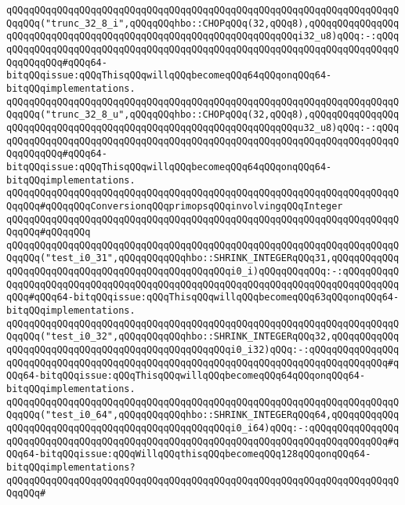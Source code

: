 \newline
\verb|qQQqqQQqqQQqqQQqqQQqqQQqqQQqqQQqqQQqqQQqqQQqqQQqqQQqqQQqqQQqqQQqqQQqqQQqqQQq("trunc_32_8_i",qQQqqQQqhbo::CHOPqQQq(32,qQQq8),qQQqqQQqqQQqqQQqqQQqqQQqqQQqqQQqqQQqqQQqqQQqqQQqqQQqqQQqqQQqqQQqqQQqi32_u8)qQQq:-:qQQqqQQqqQQqqQQqqQQqqQQqqQQqqQQqqQQqqQQqqQQqqQQqqQQqqQQqqQQqqQQqqQQqqQQqqQQqqQQqqQQq#qQQq64-bitqQQqissue:qQQqThisqQQqwillqQQqbecomeqQQq64qQQqonqQQq64-bitqQQqimplementations.|\newline
\verb|qQQqqQQqqQQqqQQqqQQqqQQqqQQqqQQqqQQqqQQqqQQqqQQqqQQqqQQqqQQqqQQqqQQqqQQqqQQq("trunc_32_8_u",qQQqqQQqhbo::CHOPqQQq(32,qQQq8),qQQqqQQqqQQqqQQqqQQqqQQqqQQqqQQqqQQqqQQqqQQqqQQqqQQqqQQqqQQqqQQqqQQqu32_u8)qQQq:-:qQQqqQQqqQQqqQQqqQQqqQQqqQQqqQQqqQQqqQQqqQQqqQQqqQQqqQQqqQQqqQQqqQQqqQQqqQQqqQQqqQQq#qQQq64-bitqQQqissue:qQQqThisqQQqwillqQQqbecomeqQQq64qQQqonqQQq64-bitqQQqimplementations.|\newline
\newline
\verb|qQQqqQQqqQQqqQQqqQQqqQQqqQQqqQQqqQQqqQQqqQQqqQQqqQQqqQQqqQQqqQQqqQQqqQQqqQQq#qQQqqQQqConversionqQQqprimopsqQQqinvolvingqQQqInteger|\newline
\verb|qQQqqQQqqQQqqQQqqQQqqQQqqQQqqQQqqQQqqQQqqQQqqQQqqQQqqQQqqQQqqQQqqQQqqQQqqQQq#qQQqqQQq|\newline
\verb|qQQqqQQqqQQqqQQqqQQqqQQqqQQqqQQqqQQqqQQqqQQqqQQqqQQqqQQqqQQqqQQqqQQqqQQqqQQq("test_i0_31",qQQqqQQqqQQqhbo::SHRINK_INTEGERqQQq31,qQQqqQQqqQQqqQQqqQQqqQQqqQQqqQQqqQQqqQQqqQQqqQQqqQQqi0_i)qQQqqQQqqQQq:-:qQQqqQQqqQQqqQQqqQQqqQQqqQQqqQQqqQQqqQQqqQQqqQQqqQQqqQQqqQQqqQQqqQQqqQQqqQQqqQQqqQQq#qQQq64-bitqQQqissue:qQQqThisqQQqwillqQQqbecomeqQQq63qQQqonqQQq64-bitqQQqimplementations.|\newline
\verb|qQQqqQQqqQQqqQQqqQQqqQQqqQQqqQQqqQQqqQQqqQQqqQQqqQQqqQQqqQQqqQQqqQQqqQQqqQQq("test_i0_32",qQQqqQQqqQQqhbo::SHRINK_INTEGERqQQq32,qQQqqQQqqQQqqQQqqQQqqQQqqQQqqQQqqQQqqQQqqQQqqQQqqQQqi0_i32)qQQq:-:qQQqqQQqqQQqqQQqqQQqqQQqqQQqqQQqqQQqqQQqqQQqqQQqqQQqqQQqqQQqqQQqqQQqqQQqqQQqqQQqqQQq#qQQq64-bitqQQqissue:qQQqThisqQQqwillqQQqbecomeqQQq64qQQqonqQQq64-bitqQQqimplementations.|\newline
\verb|qQQqqQQqqQQqqQQqqQQqqQQqqQQqqQQqqQQqqQQqqQQqqQQqqQQqqQQqqQQqqQQqqQQqqQQqqQQq("test_i0_64",qQQqqQQqqQQqhbo::SHRINK_INTEGERqQQq64,qQQqqQQqqQQqqQQqqQQqqQQqqQQqqQQqqQQqqQQqqQQqqQQqqQQqi0_i64)qQQq:-:qQQqqQQqqQQqqQQqqQQqqQQqqQQqqQQqqQQqqQQqqQQqqQQqqQQqqQQqqQQqqQQqqQQqqQQqqQQqqQQqqQQq#qQQq64-bitqQQqissue:qQQqWillqQQqthisqQQqbecomeqQQq128qQQqonqQQq64-bitqQQqimplementations?|\newline
\verb|qQQqqQQqqQQqqQQqqQQqqQQqqQQqqQQqqQQqqQQqqQQqqQQqqQQqqQQqqQQqqQQqqQQqqQQqqQQq#|\newline
